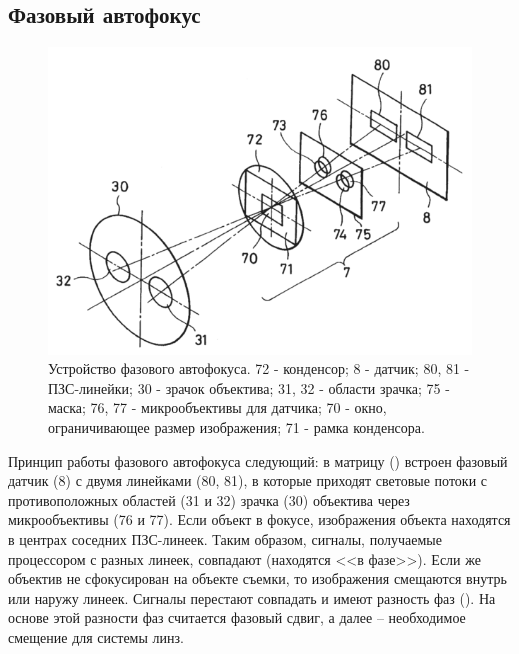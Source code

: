 \subsection{Фазовый автофокус} %
\begin{figure}[ht!] 
	\center
	\includegraphics [scale=1] {my_folder/images/phase_focus_detecror.png}
	\caption{Устройство фазового автофокуса. 72 - конденсор; 8 - датчик; 80, 81 - ПЗС-линейки; 30 - зрачок объектива; 31, 32 - области зрачка; 75 - маска; 76, 77 - микрообъективы для датчика; 70 - окно, ограничивающее размер изображения; 71 - рамка конденсора.}
	\label{fig:pdaf}
\end{figure}

Принцип работы фазового автофокуса следующий: в матрицу () встроен фазовый датчик (8) с двумя линейками (80, 81), в которые приходят световые потоки с противоположных областей (31 и 32) зрачка (30) объектива через микрообъективы (76 и 77). Если объект в фокусе,  изображения объекта находятся в центрах соседних ПЗС-линеек. Таким образом, сигналы, получаемые процессором с разных линеек, совпадают (находятся <<в фазе>>). Если же объектив не сфокусирован на объекте съемки, то изображения смещаются внутрь или наружу линеек. Сигналы перестают совпадать и имеют разность фаз (). На основе этой разности фаз считается фазовый сдвиг, а далее -- необходимое смещение для системы линз.

